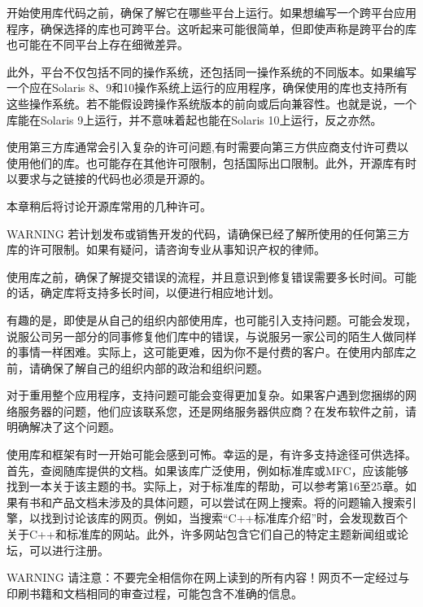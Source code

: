 
开始使用库代码之前，确保了解它在哪些平台上运行。如果想编写一个跨平台应用程序，确保选择的库也可跨平台。这听起来可能很简单，但即使声称是跨平台的库也可能在不同平台上存在细微差异。

此外，平台不仅包括不同的操作系统，还包括同一操作系统的不同版本。如果编写一个应在Solaris 8、9和10操作系统上运行的应用程序，确保使用的库也支持所有这些操作系统。若不能假设跨操作系统版本的前向或后向兼容性。也就是说，一个库能在Solaris 9上运行，并不意味着起也能在Solaris 10上运行，反之亦然。


使用第三方库通常会引入复杂的许可问题,有时需要向第三方供应商支付许可费以使用他们的库。也可能存在其他许可限制，包括国际出口限制。此外，开源库有时以要求与之链接的代码也必须是开源的。

本章稍后将讨论开源库常用的几种许可。

\begin{myWarning}{WARNING}
若计划发布或销售开发的代码，请确保已经了解所使用的任何第三方库的许可限制。如果有疑问，请咨询专业从事知识产权的律师。
\end{myWarning}


使用库之前，确保了解提交错误的流程，并且意识到修复错误需要多长时间。可能的话，确定库将支持多长时间，以便进行相应地计划。

有趣的是，即使是从自己的组织内部使用库，也可能引入支持问题。可能会发现，说服公司另一部分的同事修复他们库中的错误，与说服另一家公司的陌生人做同样的事情一样困难。实际上，这可能更难，因为你不是付费的客户。在使用内部库之前，请确保了解自己的组织内部的政治和组织问题。

对于重用整个应用程序，支持问题可能会变得更加复杂。如果客户遇到您捆绑的网络服务器的问题，他们应该联系您，还是网络服务器供应商？在发布软件之前，请明确解决了这个问题。

使用库和框架有时一开始可能会感到可怖。幸运的是，有许多支持途径可供选择。首先，查阅随库提供的文档。如果该库广泛使用，例如标准库或MFC，应该能够找到一本关于该主题的书。实际上，对于标准库的帮助，可以参考第16至25章。如果有书和产品文档未涉及的具体问题，可以尝试在网上搜索。将的问题输入搜索引擎，以找到讨论该库的网页。例如，当搜索“C++标准库介绍”时，会发现数百个关于C++和标准库的网站。此外，许多网站包含它们自己的特定主题新闻组或论坛，可以进行注册。

\begin{myWarning}{WARNING}
请注意：不要完全相信你在网上读到的所有内容！网页不一定经过与印刷书籍和文档相同的审查过程，可能包含不准确的信息。
\end{myWarning}

